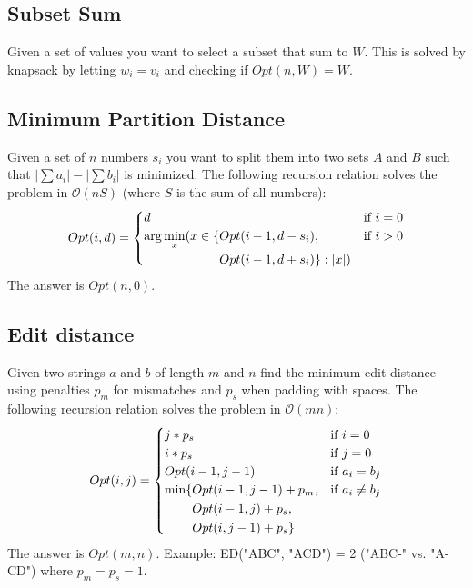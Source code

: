 \documentclass[8pt,a4paper,landscape,oneside]{amsart}
\newcommand{\bigO}{\mathcal{O}}
\begin{document}
\begin{multicols*}{3}
  \subsection{Subset Sum}
  Given a set of values you want to select a subset that sum to $W$. This is solved by knapsack by letting $w_i = v_i$ and checking if $Opt(n, W) = W$.
  
  \subsection{Minimum Partition Distance}
  Given a set of $n$ numbers $s_i$ you want to split them into two sets $A$ and $B$ such that $|\sum a_i| - |\sum b_i|$ is minimized. The following recursion relation solves the problem in $\bigO(nS)$ (where $S$ is the sum of all numbers):
  \[
  Opt(i,d) = \begin{cases}
  d & \text{if } i=0 \\
  \begin{aligned}[t]\arraycolsep=0pt
    \arg\min\limits_x(x \in \{ & Opt(i-1,d-s_i), \\ &
    Opt(i-1,d+s_i)\} : |x|)
  \end{aligned} & \text{if } i > 0 \\
  
  \end{cases}
  \]
  The answer is $Opt(n, 0)$.
  
  \subsection{Edit distance}
  Given two strings $a$ and $b$ of length $m$ and $n$ find the minimum edit distance using penalties $p_m$ for mismatches and $p_s$ when padding with spaces. The following recursion relation solves the problem in $\bigO(mn)$:
  \[
  Opt(i,j) = \begin{cases}
  j*p_s & \text{if } i=0 \\
  i*p_s & \text{if } j=0 \\
  Opt(i-1,j-1) & \text{if } a_i=b_j \\
  \begin{aligned}[t]\arraycolsep=0pt
    \min\lbrace &
      Opt(i-1,j-1) + p_m, \\ &
      Opt(i-1,j) + p_s, \\ & 
      Opt(i,j-1) + p_s \rbrace
  \end{aligned} & \text{if } a_i\neq b_j
  \end{cases}
  \]
  The answer is $Opt(m,n)$. Example: ED("ABC", "ACD") = 2 ("ABC-" vs. "A-CD") where $p_m = p_s = 1$.
  

\end{multicols*}
\end{document}
